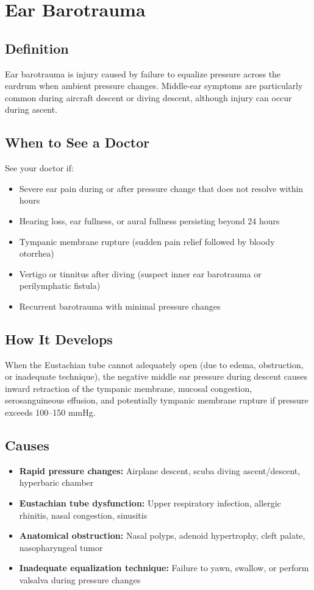 \chapter{Ear Barotrauma}

\section*{Definition}
Ear barotrauma is injury caused by failure to equalize pressure across the eardrum when ambient pressure changes. Middle-ear symptoms are particularly common during aircraft descent or diving descent, although injury can occur during ascent.

\section*{When to See a Doctor}
See your doctor if:
\begin{itemize}
  \item Severe ear pain during or after pressure change that does not resolve within hours
  \item Hearing loss, ear fullness, or aural fullness persisting beyond 24 hours
  \item Tympanic membrane rupture (sudden pain relief followed by bloody otorrhea)
  \item Vertigo or tinnitus after diving (suspect inner ear barotrauma or perilymphatic fistula)
  \item Recurrent barotrauma with minimal pressure changes
\end{itemize}

\section*{How It Develops}
When the Eustachian tube cannot adequately open (due to edema, obstruction, or inadequate technique), the negative middle ear pressure during descent causes inward retraction of the tympanic membrane, mucosal congestion, serosanguineous effusion, and potentially tympanic membrane rupture if pressure exceeds 100--150 mmHg.

\section*{Causes}
\begin{itemize}
  \item \textbf{Rapid pressure changes:} Airplane descent, scuba diving ascent/descent, hyperbaric chamber
  \item \textbf{Eustachian tube dysfunction:} Upper respiratory infection, allergic rhinitis, nasal congestion, sinusitis
  \item \textbf{Anatomical obstruction:} Nasal polyps, adenoid hypertrophy, cleft palate, nasopharyngeal tumor
  \item \textbf{Inadequate equalization technique:} Failure to yawn, swallow, or perform valsalva during pressure changes
\end{itemize}

